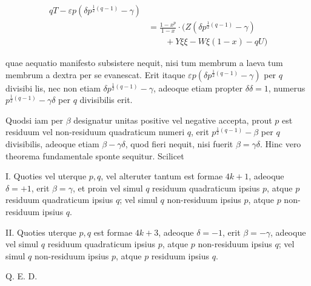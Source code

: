 \[
\begin{aligned}
qT-\varepsilon p(\delta p^{\frac12(q-1)}-\gamma)\\&=\frac{1-x^p}{1-x}\cdot(Z(\delta p^{\frac12(q-1)}-\gamma)\\&\qquad+Y\xi\xi-W\xi(1-x)-qU)
\end{aligned}
\]

quae aequatio manifesto subsistere nequit, nisi tum membrum a laeva tum membrum a dextra per se evanescat. Erit itaque $\varepsilon p(\delta p^{\frac12(q-1)}-\gamma)$ per $q$ divisibi%
%
lis, nec non etiam $\delta p^{\frac12(q-1)}-\gamma$, adeoque etiam propter $\delta\delta=1$, numerus $p^{\frac12(q-1)}-\gamma\delta$ per $q$ divisibilis erit.

Quodsi iam per $\beta$ designatur unitas positive vel negative accepta, prout $p$ est residuum vel non-residuum quadraticum numeri $q$, erit $p^{\frac12(q-1)}-\beta$ per $q$ divisibilis, adeoque etiam $\beta-\gamma\delta$, quod fieri nequit, nisi fuerit $\beta=\gamma\delta$. Hinc vero theorema fundamentale sponte sequitur. Scilicet

I. Quoties vel uterque $p,q$, vel alteruter tantum est formae $4k+1$, adeoque $\delta=+1$, erit $\beta=\gamma$, et proin vel simul $q$ residuum quadraticum ipsius $p$, atque $p$ residuum quadraticum ipsius $q$; vel simul $q$ non-residuum ipsius $p$, atque $p$ non-residuum ipsius $q$.

II. Quoties uterque $p,q$ est formae $4k+3$, adeoque $\delta=-1$, erit $\beta=-\gamma$, adeoque vel simul $q$ residuum quadraticum ipsius $p$, atque $p$ non-residuum ipsius $q$; vel simul $q$ non-residuum ipsius $p$, atque $p$ residuum ipsius $q$.

Q. E. D.

